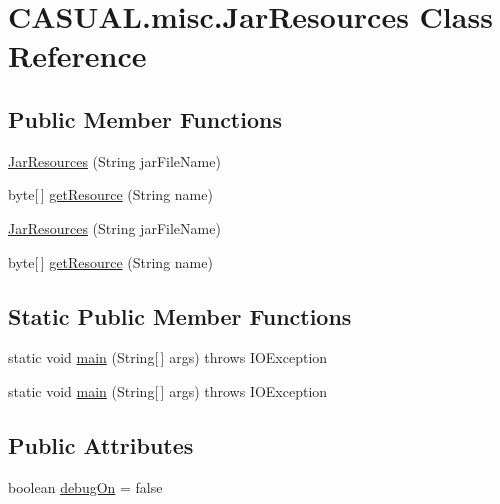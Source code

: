 \hypertarget{class_c_a_s_u_a_l_1_1misc_1_1_jar_resources}{\section{C\-A\-S\-U\-A\-L.\-misc.\-Jar\-Resources Class Reference}
\label{class_c_a_s_u_a_l_1_1misc_1_1_jar_resources}
}
\subsection*{Public Member Functions}
\begin{DoxyCompactItemize}
\item 
\hyperlink{class_c_a_s_u_a_l_1_1misc_1_1_jar_resources_ac8ba46fea06a1252e082af6ea9a839e0}{Jar\-Resources} (String jar\-File\-Name)
\item 
byte\mbox{[}$\,$\mbox{]} \hyperlink{class_c_a_s_u_a_l_1_1misc_1_1_jar_resources_a85bd36fff3d70021db81964e513872e3}{get\-Resource} (String name)
\item 
\hyperlink{class_c_a_s_u_a_l_1_1misc_1_1_jar_resources_ac8ba46fea06a1252e082af6ea9a839e0}{Jar\-Resources} (String jar\-File\-Name)
\item 
byte\mbox{[}$\,$\mbox{]} \hyperlink{class_c_a_s_u_a_l_1_1misc_1_1_jar_resources_a85bd36fff3d70021db81964e513872e3}{get\-Resource} (String name)
\end{DoxyCompactItemize}
\subsection*{Static Public Member Functions}
\begin{DoxyCompactItemize}
\item 
static void \hyperlink{class_c_a_s_u_a_l_1_1misc_1_1_jar_resources_a63053fd99282d4d90035563a5e2a5aa1}{main} (String\mbox{[}$\,$\mbox{]} args)  throws I\-O\-Exception 
\item 
static void \hyperlink{class_c_a_s_u_a_l_1_1misc_1_1_jar_resources_a63053fd99282d4d90035563a5e2a5aa1}{main} (String\mbox{[}$\,$\mbox{]} args)  throws I\-O\-Exception 
\end{DoxyCompactItemize}
\subsection*{Public Attributes}
\begin{DoxyCompactItemize}
\item 
boolean \hyperlink{class_c_a_s_u_a_l_1_1misc_1_1_jar_resources_af1fa14750d2d0b217ac8f5b0ec807a10}{debug\-On} = false
\end{DoxyCompactItemize}


